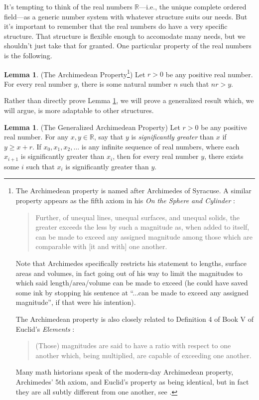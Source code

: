 \documentclass[reqno]{article}
\theoremstyle{definition}
\newtheorem{lemma}[theorem]{Lemma}
\begin{document}
It's tempting to think of the real numbers $\mathbb R$---i.e., the unique
complete ordered field---as a generic number system with whatever
structure suits our needs. But it's important to remember that the
real numbers do have a very specific structure. That structure is
flexible enough to accomodate many needs, but we shouldn't just
take that for granted. One particular property of the real numbers
is the following.

\begin{lemma}
\label{specializedarchimedeanlemma}
(The Archimedean Property\footnote{The Archimedean property is named after Archimedes of Syracuse.
A similar property appears as the fifth axiom in his \emph{On the Sphere
and Cylinder} \cite{archimedes}:
\begin{quote}
    Further, of unequal lines, unequal surfaces, and unequal
    solids, the greater exceeds the less by such a magnitude
    as, when added to itself, can be made to exceed any
    assigned magnitude among those which are comparable with
    [it and with] one another.
\end{quote}
Note that Archimedes specifically restricts his statement to
lengths, surface areas and volumes, in fact going out of his
way to limit the magnitudes to which said length/area/volume
can be made to exceed (he could have saved some ink
by stopping his sentence at ``...can be made to exceed any
assigned magnitude'', if that were his intention).

The Archimedean property is also closely related to Definition 4 of Book V of Euclid's
\emph{Elements} \cite{euclid}:
\begin{quote}
    (Those) magnitudes are said to have a ratio
    with respect to one another which, being
    multiplied, are capable of exceeding one
    another.
\end{quote}
Many math historians
speak of the modern-day Archimedean property, Archimedes' 5th axiom, and Euclid's
property as being identical, but in fact they are all subtly different from one
another, see \cite{bair2013mathematical}.})
Let $r>0$ be any positive real number.
For every real number $y$, there is some natural number $n$
such that $nr>y$.
\end{lemma}

Rather than directly prove Lemma \ref{specializedarchimedeanlemma},
we will prove a generalized result which, we will argue, is
more adaptable to other structures.

\begin{lemma}
\label{generalizedarchimedeanlemma}
(The Generalized Archimedean Property)
Let $r>0$ be any positive real number.
For any $x,y\in\mathbb R$, say that $y$ is \emph{significantly greater}
than $x$ if $y\geq x+r$.
If $x_0,x_1,x_2,\ldots$ is any infinite sequence of real numbers,
where each $x_{i+1}$ is significantly greater than $x_i$, then for every real number $y$,
there exists some $i$ such that $x_i$ is significantly greater than $y$.
\end{lemma}
\end{document}
